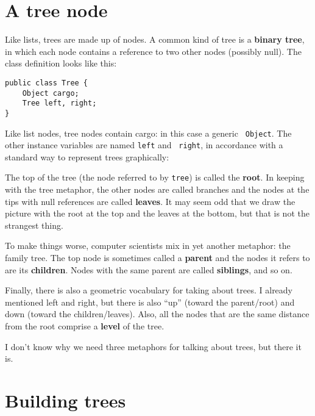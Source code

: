 \section{A tree node}

Like lists, trees are made up of nodes.  A common kind of tree is
a {\bf binary tree}, in which each node contains a reference to two
other nodes (possibly null).  The class definition looks like this:

\begin{verbatim}
public class Tree {
    Object cargo;
    Tree left, right;
}
\end{verbatim}
%
Like list nodes, tree nodes contain cargo: in this case a generic {\tt
Object}.  The other instance variables are named {\tt left} and {\tt
right}, in accordance with a standard way to represent trees
graphically:


The top of the tree (the node referred to by {\tt tree}) is
called the {\bf root}.  In keeping with the tree
metaphor, the other nodes are called branches and the nodes
at the tips with null references are called {\bf leaves}.  It
may seem odd that we draw the picture with the root at the top
and the leaves at the bottom, but that is not the strangest thing.


To make things worse, computer scientists mix in yet another
metaphor: the family tree.  The top node is sometimes called
a {\bf parent} and the nodes it refers to are its {\bf children}.
Nodes with the same parent are called {\bf siblings}, and so on.

Finally, there is also a geometric vocabulary for taking
about trees.  I already mentioned left and right, but there is
also ``up'' (toward the parent/root) and down (toward the
children/leaves).  Also, all the nodes that are the same
distance from the root comprise a {\bf level} of the tree.

I don't know why we need three metaphors for talking about trees,
but there it is.


\section {Building trees}

